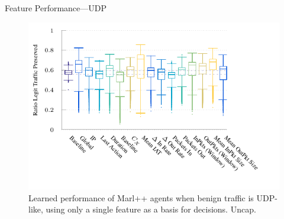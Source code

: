 \documentclass[aspectratio=169,xcolor={dvipsnames}
,hide notes
]{beamer}
\begin{document}
\begin{frame}{Feature Performance---UDP}
\begin{figure}
	\centering
	\includegraphics[width=0.8\linewidth]{../plots/ftprep-box}
	\caption{
		Learned performance of Marl++ agents when benign traffic is UDP-like, using only a single feature as a basis for decisions. Uncap.
		\label{fig:udp-feature-plots}
	}
\end{figure}
\end{frame}
\end{document}

